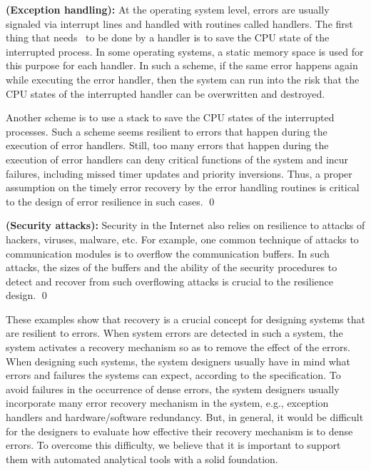 \begin{example} {\bf (Exception handling):} 
\label{exmp.ehan} 
At the operating system level, errors are usually signaled via 
interrupt lines and handled with routines called handlers.  
The first thing that needs~\label{reply2.needs.to} to be done by a handler is to save 
the CPU state of the interrupted process. 
In some operating systems, a static memory space is used for 
this purpose for each handler. 
In such a scheme, if the same error happens again while executing 
the error handler, then the system can run into the risk that 
the CPU states of the interrupted handler can be overwritten and 
destroyed. 

Another scheme is to use a stack to save the CPU states of the interrupted 
processes.  
Such a scheme seems resilient to errors that happen during\label{reply1.durin1} the execution of 
error handlers.  
Still, too many errors that happen during the execution of error handlers
can deny critical functions\label{reply2.delay.timely} of the system and 
incur failures, including missed timer updates and priority inversions.   
Thus, a proper assumption on the timely error recovery by 
the error handling routines is critical to the design of 
error resilience in such cases.  
\qed 
\end{example} 

\begin{example} {\bf (Security attacks):} 
\label{exmp.satt}
Security in the Internet also relies on resilience to attacks 
of hackers, viruses,\label{reply2.viruses} malware, etc.  
For example, one common technique of attacks\label{reply2.attacks} 
to communication modules is to 
overflow the communication buffers.  
In such attacks, the sizes\label{reply2.sizes} of the buffers and the ability 
of the security procedures to detect and recover 
from such overflowing attacks is crucial to the resilience design.  
\qed 
\end{example} 

These examples show that recovery is a crucial concept for\label{reply2.in2for} designing systems 
that are resilient to errors. 
When system errors are detected in such a system, 
the system activates a recovery mechanism so as to remove the effect of the errors. 
When designing such systems,\label{reply2.such.systems} the system designers usually
have in mind 
what errors and failures the systems can expect, according to the specification.  
\label{reply2.comparatively}
To avoid failures in the occurrence of dense errors, the system designers usually incorporate many error recovery mechanism 
in the system, e.g., exception handlers and hardware/software redundancy. 
But, in general, it would be difficult for the designers to evaluate 
how effective their recovery mechanism is to dense errors.  
To overcome this difficulty, we believe that it is important to 
support them with automated analytical tools with a solid foundation.  

